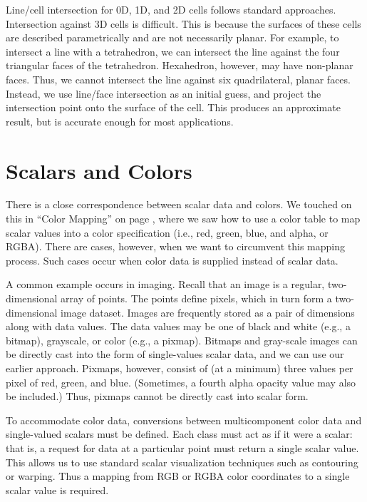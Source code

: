 Line/cell intersection for 0D, 1D, and 2D cells follows standard approaches. Intersection against 3D cells is difficult. This is because the surfaces of these cells are described parametrically and are not necessarily planar. For example, to intersect a line with a tetrahedron, we can intersect the line against the four triangular faces of the tetrahedron. Hexahedron, however, may have non-planar faces. Thus, we cannot intersect the line against six quadrilateral, planar faces. Instead, we use line/face intersection as an initial guess, and project the intersection point onto the surface of the cell. This produces an approximate result, but is accurate enough for most applications.

\section{Scalars and Colors}

There is a close correspondence between scalar data and colors. We touched on this in ``Color Mapping'' on page \pageref{subsec:color_mapping}, where we saw how to use a color table to map scalar values into a color specification (i.e., red, green, blue, and alpha, or RGBA). There are cases, however, when we want to circumvent this mapping process. Such cases occur when color data is supplied instead of scalar data.

A common example occurs in imaging. Recall that an image is a regular, two-dimensional array of points. The points define pixels, which in turn form a two-dimensional image dataset. Images are frequently stored as a pair of dimensions along with data values. The data values may be one of black and white (e.g., a bitmap), grayscale, or color (e.g., a pixmap). Bitmaps and gray-scale images can be directly cast into the form of single-values scalar data, and we can use our earlier approach. Pixmaps, however, consist of (at a minimum) three values per pixel of red, green, and blue. (Sometimes, a fourth alpha opacity value may also be included.) Thus, pixmaps cannot be directly cast into scalar form.

To accommodate color data, conversions between multicomponent color data and single-valued scalars must be defined. Each class must act as if it were a scalar: that is, a request for data at a particular point must return a single scalar value. This allows us to use standard scalar visualization techniques such as contouring or warping. Thus a mapping from RGB or RGBA color coordinates to a single scalar value is required.


